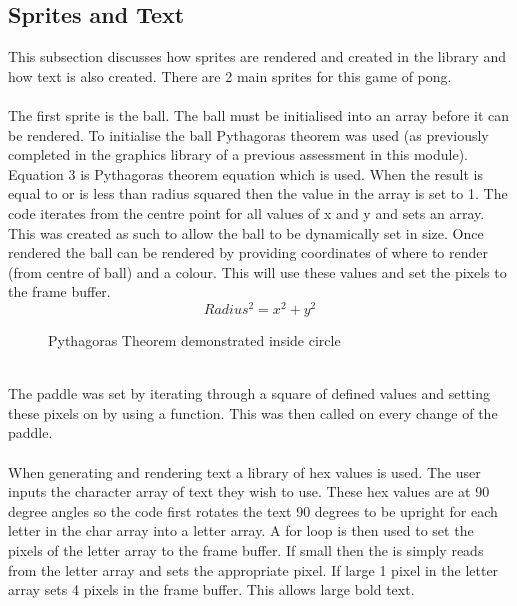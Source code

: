 \documentclass[a4paper,12pt]{article}
\begin{document}
\subsection{Sprites and Text}
\begin{flushleft}
This subsection discusses how sprites are rendered and created in the library and how text is also created. There are 2 main sprites for this game of pong.
\\ \- \\
The first sprite is the ball. The ball must be initialised into an array before it can be rendered. To initialise the ball Pythagoras theorem was used (as previously completed in the graphics library of a previous assessment in this module). Equation 3 is Pythagoras theorem equation which is used. When the result is equal to or is less than radius squared then the value in the array is set to 1. The code iterates from the centre point for all values of x and y and sets an array. This was created as such to allow the ball to be dynamically set in size. Once rendered the ball can be rendered by providing coordinates of where to render (from centre of ball) and a colour. This will use these values and set the pixels to the frame buffer.
\begin{equation}
	Radius^{2} = x^{2} + y^{2}
\end{equation}
\begin{figure}[H]
	\centering
	\caption{Pythagoras Theorem demonstrated inside circle}
\end{figure}
\- \\
The paddle was set by iterating through a square of defined values and setting these pixels on by using a function. This was then called on every change of the paddle.
\\ \- \\
When generating and rendering text a library of hex values is used. The user inputs the character array of text they wish to use. These hex values are at 90 degree angles so the code first rotates the text 90 degrees to be upright for each letter in the char array into a letter array. A for loop is then used to set the pixels of the letter array to the frame buffer. If small then the is simply reads from the letter array and sets the appropriate pixel. If large 1 pixel in the letter array sets 4 pixels in the frame buffer. This allows large bold text. 
\end{flushleft}
\newpage
\end{document}
